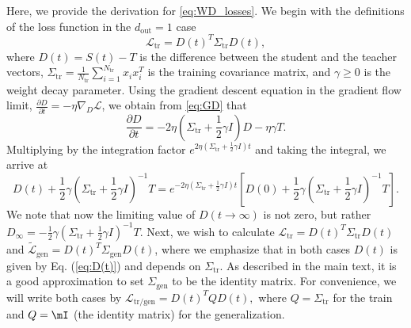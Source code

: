 \documentclass[a4paper,11pt]{article}
\newcommand{\dout}{d_\mathrm{out}}
\newcommand{\training}{\mathrm{tr}}
\newcommand{\gen}{\mathrm{gen}}
\newcommand{\mcL}{\mathcal{L}}
\begin{document}
Here, we provide the derivation for \cref{eq:WD_losses}.
We begin with the definitions of the loss function in the $\dout=1$ case
\begin{equation}
    \mathcal{L}_\training=D(t)^{T}\Sigma_{\training}D(t), 
\end{equation}
where $D(t)=S(t)-T$ is the difference between the student and the
teacher vectors, $\Sigma_{\training}=\frac{1}{N_{\training}}\sum_{i=1}^{N_{\training}}x_{i}x_{i}^{T}$
is the training covariance matrix, and $\gamma\ge0$ is the weight decay
parameter. 
Using the gradient descent equation in the gradient flow limit, $\frac{\partial D}{\partial t}=-\eta\nabla_{D}\mathcal{L}$,
we obtain from \cref{eq:GD} that
\begin{equation}
    \frac{\partial D}{\partial t}=-2\eta\left(\Sigma_{\training}+\frac{1}{2}\gamma I\right)D-\eta\gamma T.
\end{equation}
Multiplying by the integration factor $e^{2\eta\left(\Sigma_{\training}+\frac{1}{2}\gamma I\right)t}$
and taking the integral, we arrive at
\begin{equation}
    D(t)
        + \frac{1}{2}\gamma
        \left(\Sigma_{\training}+\frac{1}{2}\gamma I\right)^{-1}T=e^{-2\eta\left(\Sigma_\training+\frac{1}{2}\gamma I\right)t}\left[D(0)+\frac{1}{2}\gamma\left(\Sigma_{\training}+\frac{1}{2}\gamma I\right)^{-1}T\right].
        \label{eq:D(t)}
\end{equation}
We note that now the limiting value of $D(t\rightarrow\infty)$ is
not zero, but rather $D_\infty=-\frac{1}{2}\gamma\left(\Sigma_{\training}+\frac{1}{2}\gamma I\right)^{-1}T$.
Next, we wish to calculate $\mcL_\training=D(t)^{T}\Sigma_{\training}D(t)$
and $\mathcal{\tilde{L}}_{\gen}=D(t)^{T}\Sigma_{\gen}D(t)$,
where we emphasize that in both cases $D(t)$ is given by Eq. (\ref{eq:D(t)})
and depends on $\Sigma_{\training}$. As described in the main text, it is a good approximation to set $\Sigma_{\gen}$ to be the identity matrix. For
convenience, we will write both cases by $\mcL_{\training/\gen}=D(t)^{T}QD(t),$
where $Q=\Sigma_{\training}$ for the train and $Q=\mI$ (the identity
matrix) for the generalization.
\end{document}

